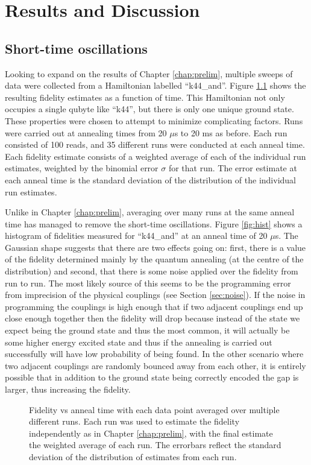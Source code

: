 \chapter{Results and Discussion}
\section{Short-time oscillations}
Looking to expand on the results of Chapter \ref{chap:prelim}, multiple sweeps of data were collected from a Hamiltonian labelled ``k44\_and''.  Figure \ref{fig:results_avg} shows the resulting fidelity estimates as a function of time.  This Hamiltonian not only occupies a single qubyte like ``k44'', but there is only one unique ground state.  These properties were chosen to attempt to minimize complicating factors.  Runs were carried out at annealing times from 20 $\mu$s to 20 ms as before.  Each run consisted of 100 reads, and 35 different runs were conducted at each anneal time.  Each fidelity estimate consists of a weighted average of each of the individual run estimates, weighted by the binomial error $\sigma$ for that run.
The error estimate at each anneal time is the standard deviation of the distribution of the individual run estimates.

Unlike in Chapter \ref{chap:prelim}, averaging over many runs at the same anneal time has managed to remove the short-time oscillations.  Figure \ref{fig:hist} shows a histogram of fidelities measured for ``k44\_and'' at an anneal time of 20 $\mu$s.  The Gaussian shape suggests that there are two effects going on: first, there is a value of the fidelity determined mainly by the quantum annealing (at the centre of the distribution) and second, that there is some noise applied over the fidelity from run to run.  The most likely source of this seems to be the programming error from imprecision of the physical couplings (see Section \ref{sec:noise}).  If the noise in programming the couplings is high enough that if two adjacent couplings end up close enough together then the fidelity will drop because instead of the state we expect being the ground state and thus the most common, it will actually be some higher energy excited state and thus if the annealing is carried out successfully will have low probability of being found.  In the other scenario where two adjacent couplings are randomly bounced away from each other, it is entirely possible that in addition to the ground state being correctly encoded the gap is larger, thus increasing the fidelity.

\begin{figure}
	\caption[Averaged Anneal Results]{Fidelity vs anneal time with each data point averaged over multiple different runs.  Each run was used to estimate the fidelity independently as in Chapter \ref{chap:prelim}, with the final estimate the weighted average of each run.  The errorbars reflect the standard deviation of the distribution of estimates from each run.}
	\label{fig:results_avg}
\end{figure}

